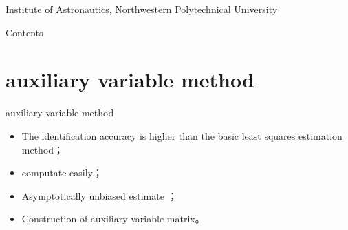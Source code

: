 \DeclareMathOperator*{\argmin}{arg\,min}

\newcommand{\vect}[1]{\boldsymbol{#1}}

\def\lecturename{ System Identification }

\title{\insertlecture}

\author{Xing Chao}

\institute
{
   Institute of Astronautics, Northwestern Polytechnical University 
}


\subtitle{ Improved algorithm }
\date{2017}



\begin{frame}
  \maketitle
\end{frame}

\begin{frame}{Contents}
\tableofcontents
\end{frame}

\section{auxiliary variable method}
\begin{frame}{auxiliary variable method}
\begin{itemize}
\item The identification accuracy is higher than the basic least squares estimation method；
\item computate easily；
\item  Asymptotically unbiased estimate ；
\item Construction of auxiliary variable matrix。
\end{itemize}
\end{frame}

